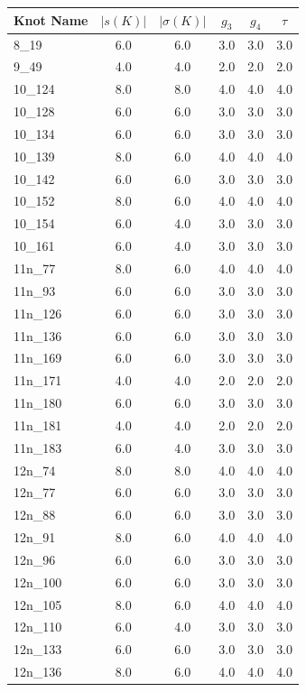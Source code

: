 \documentclass[12pt]{article}
\begin{document}
\begin{longtable}{lccccc}
\toprule
\textbf{Knot Name} & \textbf{$|s(K)|$} & \textbf{$|\sigma(K)|$} & \textbf{$g_3$} & \textbf{$g_4$} & \textbf{$\tau$} \\
\midrule
\endhead
8\_19 & 6.0 & 6.0 & 3.0 & 3.0 & 3.0 \\
9\_49 & 4.0 & 4.0 & 2.0 & 2.0 & 2.0 \\
10\_124 & 8.0 & 8.0 & 4.0 & 4.0 & 4.0 \\
10\_128 & 6.0 & 6.0 & 3.0 & 3.0 & 3.0 \\
10\_134 & 6.0 & 6.0 & 3.0 & 3.0 & 3.0 \\
10\_139 & 8.0 & 6.0 & 4.0 & 4.0 & 4.0 \\
10\_142 & 6.0 & 6.0 & 3.0 & 3.0 & 3.0 \\
10\_152 & 8.0 & 6.0 & 4.0 & 4.0 & 4.0 \\
10\_154 & 6.0 & 4.0 & 3.0 & 3.0 & 3.0 \\
10\_161 & 6.0 & 4.0 & 3.0 & 3.0 & 3.0 \\
11n\_77 & 8.0 & 6.0 & 4.0 & 4.0 & 4.0 \\
11n\_93 & 6.0 & 6.0 & 3.0 & 3.0 & 3.0 \\
11n\_126 & 6.0 & 6.0 & 3.0 & 3.0 & 3.0 \\
11n\_136 & 6.0 & 6.0 & 3.0 & 3.0 & 3.0 \\
11n\_169 & 6.0 & 6.0 & 3.0 & 3.0 & 3.0 \\
11n\_171 & 4.0 & 4.0 & 2.0 & 2.0 & 2.0 \\
11n\_180 & 6.0 & 6.0 & 3.0 & 3.0 & 3.0 \\
11n\_181 & 4.0 & 4.0 & 2.0 & 2.0 & 2.0 \\
11n\_183 & 6.0 & 4.0 & 3.0 & 3.0 & 3.0 \\
12n\_74 & 8.0 & 8.0 & 4.0 & 4.0 & 4.0 \\
12n\_77 & 6.0 & 6.0 & 3.0 & 3.0 & 3.0 \\
12n\_88 & 6.0 & 6.0 & 3.0 & 3.0 & 3.0 \\
12n\_91 & 8.0 & 6.0 & 4.0 & 4.0 & 4.0 \\
12n\_96 & 6.0 & 6.0 & 3.0 & 3.0 & 3.0 \\
12n\_100 & 6.0 & 6.0 & 3.0 & 3.0 & 3.0 \\
12n\_105 & 8.0 & 6.0 & 4.0 & 4.0 & 4.0 \\
12n\_110 & 6.0 & 4.0 & 3.0 & 3.0 & 3.0 \\
12n\_133 & 6.0 & 6.0 & 3.0 & 3.0 & 3.0 \\
12n\_136 & 8.0 & 6.0 & 4.0 & 4.0 & 4.0 \\

\end{longtable}
\end{document}
